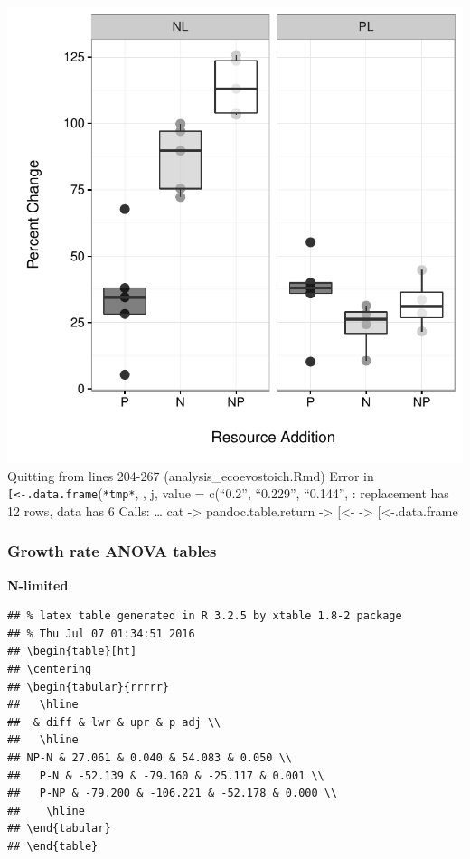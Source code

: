 \documentclass[]{article}
\begin{document}
\includegraphics{analysis_ecoevostoich_files/figure-latex/perc.change-1.pdf}
Quitting from lines 204-267 (analysis\_ecoevostoich.Rmd) Error in
\texttt{{[}\textless{}-.data.frame}(\texttt{*tmp*}, , j, value =
c(``0.2'', ``0.229'', ``0.144'', : replacement has 12 rows, data has 6
Calls: \ldots{} cat -\textgreater{} pandoc.table.return -\textgreater{}
{[}\textless{}- -\textgreater{} {[}\textless{}-.data.frame

\newpage

\subsubsection{Growth rate ANOVA
tables}\label{growth-rate-anova-tables-1}

\textbf{N-limited}

\begin{verbatim}
## % latex table generated in R 3.2.5 by xtable 1.8-2 package
## % Thu Jul 07 01:34:51 2016
## \begin{table}[ht]
## \centering
## \begin{tabular}{rrrrr}
##   \hline
##  & diff & lwr & upr & p adj \\ 
##   \hline
## NP-N & 27.061 & 0.040 & 54.083 & 0.050 \\ 
##   P-N & -52.139 & -79.160 & -25.117 & 0.001 \\ 
##   P-NP & -79.200 & -106.221 & -52.178 & 0.000 \\ 
##    \hline
## \end{tabular}
## \end{table}
\end{verbatim}
\end{document}
